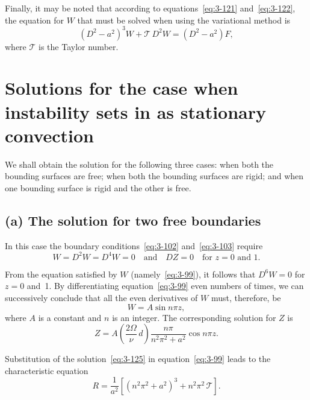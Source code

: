 Finally, it may be noted that according to equations~\eqref{eq:3-121} and~\eqref{eq:3-122}, the equation for $W$ that must be solved when using the variational method is
\begin{equation}\label{eq:3-123}
(D^2 - a^2)^3 W + \mathscr{T}\,D^2 W = (D^2 - a^2)F,
\end{equation}
where $\mathscr{T}$ is the Taylor number.

\section{Solutions for the case when instability sets in as stationary convection}\label{sec:3-27}

We shall obtain the solution for the following three cases: when both the bounding surfaces are free; when both the bounding surfaces are rigid; and when one bounding surface is rigid and the other is free.

\subsection*{(a) The solution for two free boundaries}

In this case the boundary conditions~\eqref{eq:3-102} and~\eqref{eq:3-103} require
\begin{equation}\label{eq:3-124}
W = D^2 W = D^4 W = 0 \quad \text{and} \quad DZ = 0 \quad \text{for } z = 0 \text{ and } 1.
\end{equation}

From the equation satisfied by $W$ (namely~\eqref{eq:3-99}), it follows that $D^6 W = 0$ for $z = 0$ and~1. By differentiating equation~\eqref{eq:3-99} even numbers of times, we can successively conclude that all the even derivatives of $W$ must, therefore, be
\begin{equation}\label{eq:3-125}
W = A\sin n\pi z,
\end{equation}
where $A$ is a constant and $n$ is an integer. The corresponding solution for $Z$ is
\begin{equation}\label{eq:3-126}
Z = A\!\left(\frac{2\Omega}{\nu}\,d\right)\!\frac{n\pi}{n^2\pi^2 + a^2}\cos n\pi z.
\end{equation}

Substitution of the solution~\eqref{eq:3-125} in equation~\eqref{eq:3-99} leads to the characteristic equation
\begin{equation}\label{eq:3-127}
R = \frac{1}{a^2}[(n^2\pi^2 + a^2)^3 + n^2\pi^2\,\mathscr{T}].
\end{equation}

